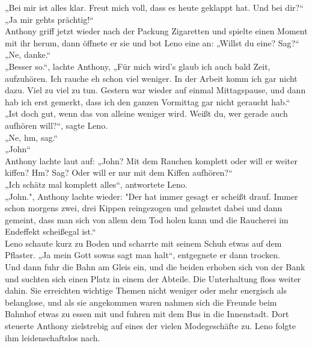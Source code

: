 \documentclass[ngerman,smalldemyvopaper,11pt,oneside,onecolumn,openright,extrafontsizes]{memoir}
\begin{document}
„Bei mir ist alles klar. Freut mich voll, dass es heute geklappt hat. Und bei dir?“
\vspace{0.5em} \\
„Ja mir gehts prächtig!“
\vspace{0.5em} \\
Anthony griff jetzt wieder nach der Packung Zigaretten und spielte einen Moment mit ihr herum, dann öffnete er sie und bot Leno eine an:
„Willst du eine? Sag?“
\vspace{0.5em} \\
„Ne, danke.“
\vspace{0.5em} \\
„Besser so.“, lachte Anthony, „Für mich wird's glaub ich auch bald Zeit, aufzuhören. Ich rauche eh schon viel weniger. In der Arbeit komm ich gar nicht dazu. Viel zu viel zu tun. Gestern war wieder auf einmal Mittagspause, und dann hab ich erst gemerkt, dass ich den ganzen Vormittag gar nicht geraucht hab.“
\vspace{0.5em} \\
„Ist doch gut, wenn das von alleine weniger wird. Weißt du, wer gerade auch aufhören will?“, sagte Leno.
\vspace{0.5em} \\
„Ne, hm, sag.“
\vspace{0.5em} \\
„John“
\vspace{0.5em} \\
Anthony lachte laut auf: „John? Mit dem Rauchen komplett oder will er weiter kiffen? Hm? Sag? Oder will er nur mit dem Kiffen aufhören?“
\vspace{0.5em} \\
„Ich schätz mal komplett alles“, antwortete Leno.
\vspace{0.5em} \\
„John.", Anthony lachte wieder: "Der hat immer gesagt er scheißt drauf. Immer schon morgens zwei, drei Kippen reingezogen und gehustet dabei und dann gemeint, dass man sich von allem dem Tod holen kann und die Raucherei im Endeffekt scheißegal ist.“
\vspace{0.5em} \\
Leno schaute kurz zu Boden und scharrte mit seinem Schuh etwas auf dem Pflaster.
„Ja mein Gott sowas sagt man halt“, entgegnete er dann trocken.
\vspace{0.5em} \\
Und dann fuhr die Bahn am Gleis ein, und die beiden erhoben sich von der Bank und suchten sich einen Platz in einem der Abteile. Die Unterhaltung floss weiter dahin. Sie erreichten wichtige Themen nicht weniger oder mehr energisch als belanglose, und als sie angekommen waren nahmen sich die Freunde beim Bahnhof etwas zu essen mit und fuhren mit dem Bus in die Innenstadt. Dort steuerte Anthony zielstrebig auf eines der vielen Modegeschäfte zu. Leno folgte ihm leidenschaftslos nach. 
\end{document}
